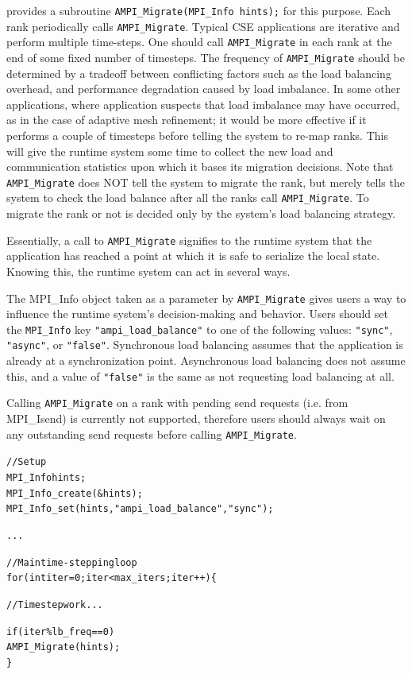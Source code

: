 \documentclass[10pt]{article}
\begin{document}
\ampi{} provides a subroutine \texttt{AMPI\_Migrate(MPI\_Info hints);} for
this purpose. Each rank periodically calls \texttt{AMPI\_Migrate}. Typical
CSE applications are iterative and perform multiple time-steps. One should call
\texttt{AMPI\_Migrate} in each rank at the end of some fixed number of
timesteps. The frequency of \texttt{AMPI\_Migrate} should be determined by a
tradeoff between conflicting factors such as the load balancing overhead, and
performance degradation caused by load imbalance. In some other applications,
where application suspects that load imbalance may have occurred, as in the
case of adaptive mesh refinement; it would be more effective if it performs a
couple of timesteps before telling the system to re-map ranks. This will give
the \ampi{} runtime system some time to collect the new load and communication
statistics upon which it bases its migration decisions. Note that
\texttt{AMPI\_Migrate} does NOT tell the system to migrate the rank, but
merely tells the system to check the load balance after all the ranks call
\texttt{AMPI\_Migrate}. To migrate the rank or not is decided only by the
system's load balancing strategy.

Essentially, a call to \texttt{AMPI\_Migrate} signifies to the runtime system
that the application has reached a point at which it is safe to serialize
the local state. Knowing this, the runtime system can act in several ways.

The MPI\_Info object taken as a parameter by \texttt{AMPI\_Migrate} gives
users a way to influence the runtime system's decision-making and behavior.
Users should set the \texttt{MPI\_Info} key \texttt{"ampi\_load\_balance"} to one
of the following values: \texttt{"sync"}, \texttt{"async"}, or \texttt{"false"}.
Synchronous load balancing assumes that the application is already at a
synchronization point. Asynchronous load balancing does not assume this, and a
value of \texttt{"false"} is the same as not requesting load balancing at all.

Calling \texttt{AMPI\_Migrate} on a rank with pending send requests (i.e. from MPI\_Isend)
is currently not supported, therefore users should always wait on any outstanding send requests
before calling \texttt{AMPI\_Migrate}.

\begin{alltt}
// Setup
MPI_Info hints;
MPI_Info_create(&hints);
MPI_Info_set(hints, "ampi_load_balance", "sync");

...

// Main time-stepping loop
for (int iter=0; iter < max_iters; iter++) \{

  // Time step work ...

  if (iter \% lb_freq == 0)
    AMPI_Migrate(hints);
\}
\end{alltt}
\end{document}
